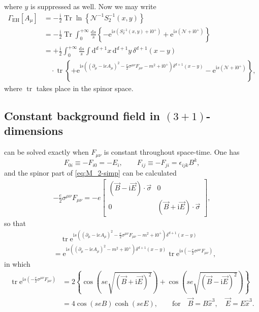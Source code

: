 \documentclass[12pt]{article}
\newcommand\mi{\mathrm{i}} %
\newcommand\me{\mathrm{e}} %
\newcommand\dif{\mathrm{d}}
\DeclareMathOperator{\tr}{tr}
\DeclareMathOperator{\Tr}{Tr}
\newcommand{\rbr}[1]{{\left(#1\right)}}
\newcommand{\cbr}[1]{{\left\{#1\right\}}}
\newcommand{\rfun}[2]{{#1}\mathopen{}\left(#2\right)\mathclose{}}
\newcommand{\sfun}[2]{{#1}\mathopen{}\left[#2\right]\mathclose{}}
\newcommand{\cfun}[2]{{#1}\mathopen{}\left\{#2\right\}\mathclose{}}
\begin{document}
where $y$ is suppressed as well. Now we may write
\begin{align}
\sfun{\varGamma_{\text{EH}}}{A_\mu} &= -\frac{\mi}{2} \Tr \cfun{\ln}{
\mathcal{N}^{-1} \rfun{S_{2}^{-1}}{x,y}} \nonumber \\
&= -\frac{\mi}{2} \Tr\int_0^{+\infty}\frac{\dif s}{s}\cbr{
-\me^{\mi s\rbr{\rfun{S_{2}^{-1}}{x,y}+\mi 0^+}}
+\me^{\mi s\rbr{\mathcal{N}+\mi 0^+}}} \nonumber \\
&= +\frac{\mi}{2} \int_0^{+\infty} \frac{\dif s}{s}
\int\dif^{d+1}x\,\dif^{d+1}y\,\rfun{\delta^{d+1}}{x-y}\nonumber \\
&\quad\cdot\cfun{\tr}{+\me^{\mi s\rbr{\rbr{\partial_{\mu} - \mi e A_\mu}^2 - 
\frac{e}{2} \sigma^{\mu\nu} F_{\mu\nu} - m^2+\mi 0^+}\rfun{\delta^{d+1}}{x-y}}
-\me^{\mi s\rbr{\mathcal{N}+\mi 0^+}}},
\end{align}
where $\tr$ takes place in the spinor space.


\subsection{Constant background field in $\rbr{3+1}$-dimensions}

 can be solved exactly when $F_{\mu\nu}$ is constant throughout 
space-time. %
One has
\begin{equation}
F_{0i} \equiv -F_{i0} = -E_i,\qquad
F_{ij} \equiv -F_{ji} = \epsilon_{ijk}B^k,
\label{eq:const-EM-strength}
\end{equation}
and the spinor part of \cref{eq:M_2-simp} can be calculated
\begin{align}
-\frac{e}{2}\sigma^{\mu\nu}F_{\mu\nu} = -e
\begin{bmatrix}
\rbr{\vec B-\mi \vec E} \cdot\vec\sigma & 0 \\
0 & \rbr{\vec B+\mi \vec E} \cdot\vec\sigma
\end{bmatrix},
\end{align}
so that
\begin{align}
&\quad\tr\me^{\mi s\rbr{\rbr{\partial_{\mu} - \mi e A_\mu}^2 - 
\frac{e}{2} \sigma^{\mu\nu} F_{\mu\nu} - m^2+\mi 0^+}\rfun{\delta^{d+1}}{x-y}}
\nonumber \\
&= \me^{\mi s\rbr{\rbr{\partial_{\mu} - \mi e A_\mu}^2
- m^2+\mi 0^+}\rfun{\delta^{d+1}}{x-y}}
\tr\me^{\mi s\rbr{-\frac{e}{2}\sigma^{\mu\nu}F_{\mu\nu}}},
\end{align}
in which
\begin{align}
\tr\me^{\mi s\rbr{-\frac{e}{2}\sigma^{\mu\nu}F_{\mu\nu}}} &= 2\cbr{
\rfun{\cos}{se\sqrt{\rbr{\vec B+\mi\vec E}^2}}+
\rfun{\cos}{se\sqrt{\rbr{\vec B-\mi\vec E}^2}}} \\
&= 4\rfun{\cos}{seB}\rfun{\cosh}{seE},\qquad\text{for}\quad
\vec B = B \hat x^3,\quad \vec E = E \hat x^3.
\end{align}
\end{document}

